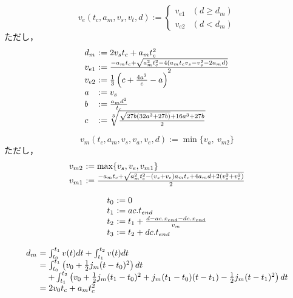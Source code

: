 \documentclass[a5paper]{ltjsarticle}
\begin{document}
$$
    v_e(t_c, a_m, v_s, v_t, d) :=
    \left\{\begin{array}{ll}
        v_{e1} & (d        \ge d_m)
        \\
        v_{e2} & (d < d_m)
    \end{array}\right.
$$
ただし，
$$
    \begin{array}{l@{~}l}
        d_m    & := 2 v_s t_c + a_m t_c^2
        \\
        v_{e1} & :=
        \frac{-a_m t_c + \sqrt{a_m^2 t_c^2-4(a_m t_c v_s - v_s^2 - 2a_m d)}}{2}
        \\
        v_{e2} & :=
        \frac{1}{3}\left(c +\frac{4a^2}{c}
        -a
        \right)
        \\
        a      & := v_s
        \\
        b      & :=                       \frac{a_md^2}{t_c}
        \\
        c      & :=                       \sqrt[3]{\frac{\sqrt{27b(32a^3+27b)} + 16a^3+27b}{2}}
    \end{array}
$$

$$
    v_m(t_c, a_m, v_s, v_a, v_e, d) := \min\{v_a,~v_{m2}\}
$$
ただし，
$$
    \begin{array}{l@{~}l}
        v_{m2} & := \max\{v_s, v_e, v_{m1}\}                                                   \\
        v_{m1} & := \frac{-a_mt_c + \sqrt{a_m^2t_c^2-(v_s+v_e)a_mt_c+4a_md+2(v_s^2+v_e^2)}}{2}
    \end{array}
$$

$$
    \begin{array}{l@{~}l}
        t_0 & := 0
        \\
        t_1 & := ac.t_{end}
        \\
        t_2 & := t_1 +             \frac{d - ac.x_{end} - dc.x_{end}}{v_m}
        \\
        t_3 & := t_2 + dc.t_{end}
    \end{array}
$$

$$
    \begin{array}{l@{~}l}
        d_m & =                  \int_{t_0}^{t_1}v(t) dt + \int_{t_1}^{t_2}v(t) dt
        \\
            & =                  \int_{t_0}^{t_1}\left( v_0+\frac{1}{2} j_m(t-t_0)^2 \right) dt
        \\
            & \quad+ \int_{t_1}^{t_2}\left(
        v_0+                     \frac{1}{2} j_m(t_1-t_0)^2
        +j_m(t_1-t_0)(t-t_1) -   \frac{1}{2}j_m(t-t_1)^2
        \right) dt
        \\
            & = 2v_0t_c+a_mt_c^2
    \end{array}
$$
\end{document}
